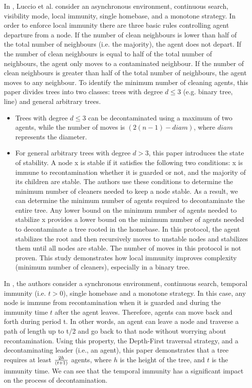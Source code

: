 In \cite{lucetal22}, Luccio et al. consider an asynchronous environment, continuous search, visibility mode, local immunity, single homebase, and a monotone strategy. In order to enforce local immunity there are three basic rules controlling agent departure from a node. If the number of clean neighbours is lower than half of the total number of neighbours (i.e. the majority), the agent does not depart. If the number of clean neighbours is equal to half of the total number of neighbours, the agent only moves to a contaminated neighbour. If the number of clean neighbours is greater than half of the total number of neighbours, the agent moves to any neighbour.
To identify the minimum number of cleaning agents, this paper divides trees into two classes: trees with degree $d \leq 3$ (e.g. binary tree, line) and general arbitrary trees.
\begin{itemize}

\item Trees with degree $d \leq 3$ can be decontaminated using a maximum of two agents,
while the number of moves is $(2(n-1) - diam)$, where $diam$ represents the diameter. 
\item For general arbitrary trees with degree $d >3$, this paper introduces the state of stability. A node x is stable if it satisfies the following two conditions: x is immune to recontamination whether it is guarded or not, and the majority of its children are stable. 
The authors use these conditions to determine the minimum number of cleaners needed to keep a node stable. As a result, we can determine the minimum number of agents required to decontaminate the entire tree. Any lower bound on the minimum number of agents needed to stabilize x provides a lower bound on the minimum number of agents needed to decontaminate a tree rooted in the homebase. In this protocol, the agent stabilizes the root and then recursively moves to unstable nodes and stabilizes them until all nodes are stable. The number of moves in this protocol is not proven. This study demonstrates how local immunity improves complexity (minimum number of cleaners), especially in a binary tree.
 \end{itemize}
In \cite{floetal13}, the authors consider a synchronous environment, continuous search, temporal immunity (i.e. $t>0$), single homebase and a monotone strategy. In this case, any node is immune from recontamination when it is guarded and during the immunity time $t$ after the agent leaves. Therefore, agents can move back and forth during period t. In other words, an agent can leave a node and traverse a path of length up to t/2 and go back to that node without worrying about recontamination. Using this property, the Depth-First traversal strategy, and a decontaminating leader (i.e., an agent), this paper demonstrates that a tree requires at least $2h\over(t+1)$ agents, where $h$ is the height of the tree, and $t$ is the immunity time. We can see that the temporal immunity has a significant impact on the process of decontamination. 


